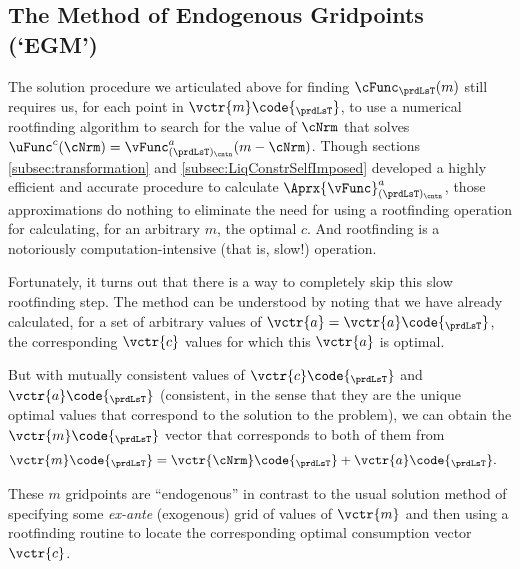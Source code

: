 \documentclass[\econtexRoot/SolvingMicroDSOPs]{subfiles}
\begin{document}
\hypertarget{the-method-of-endogenous-gridpoints}{}
\subsection{The Method of Endogenous Gridpoints (`EGM')}\label{subsec:egm}

The solution procedure we articulated above for finding $\cFunc_{\prdLsT}(m)$ still requires us, for each point in $\vctr{m}\code{_{\prdLsT}}$, to use a numerical rootfinding algorithm to search for the value of $\cNrm$ that solves $\uFunc^{c}(\cNrm) = \vFunc^{a}_{(\prdLsT)_\cntn}(m-\cNrm)$.  Though sections \ref{subsec:transformation} and \ref{subsec:LiqConstrSelfImposed} developed a highly efficient and accurate procedure to calculate $\Aprx{\vFunc}^{a}_{(\prdLsT)_\cntn}$, those approximations do nothing to eliminate the need for using a rootfinding operation for calculating, for an arbitrary $m$, the optimal $c$.  And rootfinding is a notoriously computation-intensive (that is, slow!) operation.

Fortunately, it turns out that there is a way to completely skip this slow rootfinding step.  The method can be understood by noting that we have already calculated, for a set of arbitrary values of $\vctr{a}=\vctr{a}\code{_{\prdLsT}}$, the corresponding $\vctr{c}$ values for which this $\vctr{a}$ is optimal.


But with mutually consistent values of $\vctr{c}\code{_{\prdLsT}}$ and $\vctr{a}\code{_{\prdLsT}}$ (consistent, in the sense that they are the unique optimal values that correspond to the solution to the problem), we can obtain the $\vctr{m}\code{_{\prdLsT}}$ vector that corresponds to both of them from
\begin{equation}\begin{gathered}\begin{aligned}
      \vctr{m}\code{_{\prdLsT}}  & = {\vctr{\cNrm}\code{_{\prdLsT}}+\vctr{a}\code{_{\prdLsT}}}.
    \end{aligned}\end{gathered}\end{equation}


These $m$ gridpoints are ``endogenous'' in contrast to the usual solution method of specifying some \textit{ex-ante} (exogenous) grid of values of $\vctr{m}$ and then using a rootfinding routine to locate the corresponding optimal consumption vector $\vctr{c}$.
\end{document}
